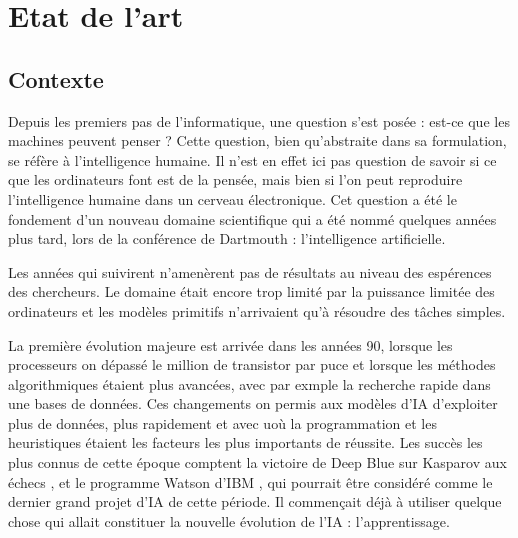 \chapter{Etat de l'art}
	\minitoc
	\newpage






\section{Contexte}

	Depuis les premiers pas de l'informatique, une question s'est posée : est-ce que les machines peuvent penser ? \cite{turing1950computing} Cette question, bien qu'abstraite dans sa formulation, se réfère à l'intelligence humaine. Il n'est en effet ici pas question de savoir si ce que les ordinateurs font est de la pensée, mais bien si l'on peut reproduire l'intelligence humaine dans un cerveau électronique. Cet question a été le fondement d'un nouveau domaine scientifique qui a été nommé quelques années plus tard, lors de la conférence de Dartmouth \cite{mccarthy1955proposal} : l'intelligence artificielle.

	Les années qui suivirent n'amenèrent pas de résultats au niveau des espérences des chercheurs. Le domaine était encore trop limité par la puissance limitée des ordinateurs et les modèles primitifs n'arrivaient qu'à résoudre des tâches simples.

	La première évolution majeure est arrivée dans les années 90, lorsque les processeurs on dépassé le million de transistor par puce et lorsque les méthodes algorithmiques étaient plus avancées, avec par exmple la recherche rapide dans une bases de données. Ces changements on permis aux modèles d'IA d'exploiter plus de données, plus rapidement et avec uoù la programmation et les heuristiques étaient les facteurs les plus importants de réussite. Les succès les plus connus de cette époque comptent la victoire de Deep Blue sur Kasparov aux échecs \cite{campbell2002deep}, et le programme Watson d'IBM \cite{ferrucci2012introduction}, qui pourrait être considéré comme le dernier grand projet d'IA de cette période. Il commençait déjà à utiliser quelque chose qui allait constituer la nouvelle évolution de l'IA : l'apprentissage.

